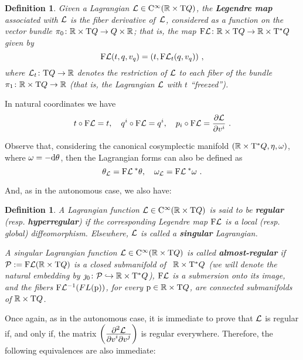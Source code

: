 \documentclass[12pt]{report}
\newtheorem{definition}[teor]{Definition}
\def\beq{\begin{equation}}
\def\eeq{\end{equation}}
\def\derpar#1#2{\frac{\partial{#1}}{\partial{#2}}}
\def\Lag{{\cal L}}
\def\d{{\rm d}}
\def\Real{\mathbb{R}}
\def\Tan{{\rm T}}
\def\Cinfty{{\rm C}^\infty}
\begin{document}
\begin{definition}
\label{legmap}
Given a Lagrangian 
$\Lag\in\Cinfty(\Real\times\Tan Q)$,  the \textbf{Legendre map}
associated with $\Lag$ is the fiber derivative of~$\Lag$,
considered as a function on the vector bundle
$\pi_0 \colon\Real \times\Tan Q\to Q \times \Real$;
that is, the map
${\rm F}\Lag \colon\Real\times\Tan Q \to\Real\times\Tan^*Q$ 
given by
$$
{\rm F}\Lag (t,q,v_q) = \left(t,{\rm F}\Lag_t (q,v_q)\right)
\,,
$$
where $\Lag_t\colon\Tan Q\to\Real$ denotes the restriction of $\Lag$ to each fiber of the bundle $\pi_1\colon\Real\times\Tan Q \to\Real$
(that is, the Lagrangian $\Lag$ with $t$ ``freezed'').
\end{definition}

In natural coordinates we have
$$
t \circ {\rm F}\Lag = t ,\quad
q^i \circ {\rm F}\Lag = q^i ,\quad p_i \circ{\rm F}\Lag =\derpar{\Lag}{v^i} \ .
$$

Observe that, considering the canonical cosymplectic manifold
$(\Real\times\Tan^*Q,\eta,\omega)$, where $\omega=-\d\theta$, 
then the Lagrangian forms can also be defined as 
\beq
\label{flom}
\theta_\Lag={\rm F}\Lag^{\;*}\theta,\quad\omega_\Lag={\rm F}\Lag^{\;*}\omega\ .
\eeq

And, as in the autonomous case, we also have:

\begin{definition}\label{de811}
A Lagrangian function $\Lag\in\Cinfty(\Real\times\Tan Q)$ is said
to be \textbf{regular}  (resp. \textbf{hyperregular}) if the corresponding
Legendre map ${\rm F}\Lag$ is a local (resp. global) diffeomorphism.
Elsewhere, $\Lag$ is called a \textbf{singular} Lagrangian.

A singular Lagrangian function $\Lag\in\Cinfty(\Real\times\Tan Q)$
 is called \textbf{almost-regular} if $\mathcal{P}:= {\rm F}\Lag(\Real\times\Tan Q)$ is
a closed submanifold of \ $\Real\times\Tan^*Q$ (we will denote
the natural embedding by $\jmath_0\colon\mathcal{P}\hookrightarrow\Real\times\Tan^*Q$), 
${\rm F}\Lag$ is a submersion onto its image, and
the fibers ${\rm F}\Lag^{-1}(FL({\rm p}))$, for every ${\rm p}\in \Real\times\Tan Q$, are
connected submanifolds of $\Real\times\Tan Q$.
\end{definition}

Once again, as in the autonomous case, it is immediate to prove that $\Lag$ is regular if, and only
if, the matrix $\left(\frac{\displaystyle\partial^2\Lag}
{\displaystyle\partial v^i
\partial v^j}\right)$ is regular everywhere.
Therefore, the following equivalences are also immediate:
\end{document}
